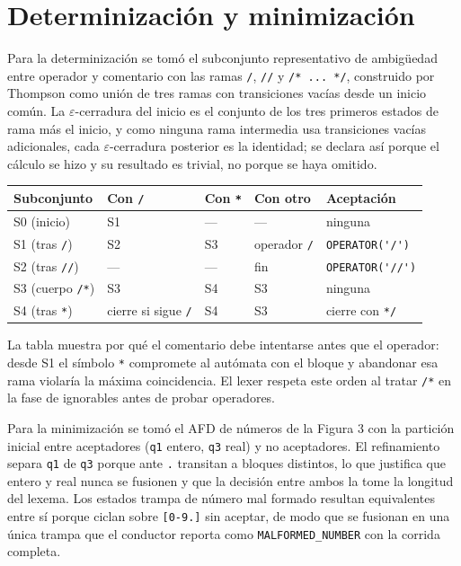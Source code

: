 \documentclass[11pt,a4paper]{article}
\begin{document}
\section{Determinización y minimización}
Para la determinización se tomó el subconjunto representativo de
ambigüedad entre operador y comentario con las ramas \verb|/|,
\verb|//| y \verb|/* ... */|, construido por Thompson como unión de
tres ramas con transiciones vacías desde un inicio común. La
$\varepsilon$-cerradura del inicio es el conjunto de los tres primeros estados de
rama más el inicio, y como ninguna rama intermedia usa transiciones
vacías adicionales, cada $\varepsilon$-cerradura posterior es la identidad; se
declara así porque el cálculo se hizo y su resultado es trivial, no
porque se haya omitido.

\begin{center}
\begin{tabular}{lllll}
  \toprule
  Subconjunto & Con \verb|/| & Con \verb|*| & Con otro & Aceptación \\
  \midrule
  S0 (inicio) & S1 & --- & --- & ninguna \\
  S1 (tras \verb|/|) & S2 & S3 & operador \verb|/| & \verb|OPERATOR('/')| \\
  S2 (tras \verb|//|) & --- & --- & fin & \verb|OPERATOR('//')| \\
  S3 (cuerpo \verb|/*|) & S3 & S4 & S3 & ninguna \\
  S4 (tras \verb|*|) & cierre si sigue \verb|/| & S4 & S3 & cierre
  con \verb|*/| \\
  \bottomrule
\end{tabular}
\end{center}

La tabla muestra por qué el comentario debe intentarse antes que el
operador: desde S1 el símbolo \verb|*| compromete al autómata con el
bloque y abandonar esa rama violaría la máxima coincidencia. El lexer
respeta este orden al tratar \verb|/*| en la fase de ignorables antes
de probar operadores.

Para la minimización se tomó el AFD de números de la Figura 3 con la
partición inicial entre aceptadores (\verb|q1| entero, \verb|q3|
real) y no aceptadores. El refinamiento separa \verb|q1| de \verb|q3|
porque ante \verb|.| transitan a bloques distintos, lo que justifica
que entero y real nunca se fusionen y que la decisión entre ambos la
tome la longitud del lexema. Los estados trampa de número mal formado
resultan equivalentes entre sí porque ciclan sobre \verb|[0-9.]| sin
aceptar, de modo que se fusionan en una única trampa que el conductor
reporta como \verb|MALFORMED_NUMBER| con la corrida completa.
\end{document}
